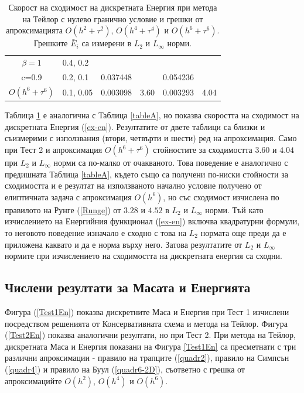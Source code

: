 \documentclass{article}
\newcommand{\rf}[1]{(\ref{#1})}
\begin{document}
\begin{table}[ht]
\begin{tabular}{||c|l|ll|ll||}
\hline
  $\beta=1$     	 	&0.4, 0.2   		&            	&         	&                  	&      \\
      c=0.9                 	&0.2, 0.1   		&0.037448	&         	& 0.054236      	&       \\
   $O(h^6+ \tau^6)$ &0.1, 0.05  		& 0.003098 	& 3.60 	& 0.003293  		& 4.04        \\
\hline
\hline 
		\end{tabular}
		\caption{Скорост на сходимост на дискретната Енергия при метода на Тейлор с нулево гранично условие и грешки от апроксимацията $O(h^{2} + \tau^2 )$, $O(h^{4} + \tau^4 )$ и $O(h^{6} + \tau^6 )$. Грешките $\bar E_i$ са измерени в $L_2$ и $L_\infty$ норми.}
\label{tableB}
\end{table}
Таблица \ref{tableB} е аналогична с Таблица \ref{tableA}, но показва скоростта на сходимост на дискретната Енергия \rf{ex-en}. Резултатите от двете таблици са близки и съизмерими с използвания (втори, четвърти и шести) ред на апроксимация. Само при  Тест 2 и апроксимация $O(h^6 + \tau^6)$ стойностите за сходимостта $3.6$0 и $4.04$ при $L_2$ и $L_{\infty}$ норми са по-малко от очакваното. Това поведение е аналогично с предишната Таблица \ref{tableA}, където също са получени по-ниски стойности за сходимостта и е резултат на използваното начално условие получено от елиптичната задача с апроксимация $O(h^6)$, но със сходимост изчислена по правилото на Рунге \rf{Runge} от $3.28$ и $4.52$ в $L_2$ и $L_\infty$ норми. Тъй като изчислението на Енергийния функционал \rf{ex-en} включва квадратурни формули, то неговото поведение изначало е сходно с това на $L_2$ нормата още преди да е приложена каквато и да е норма върху него. Затова резултатите от $L_2$ и $L_\infty$ нормите при изчислението на сходимостта на дискретната енергия са сходни.

\subsection{Числени резултати за Масата и Енергията}
Фигура \rf{Test1En} показва дискретните Маса и Енергия при Тест 1 изчислени посредством решенията от Консервативната схема и метода на Тейлор. Фигура \rf{Test2En} показва аналогични резултати, но при Тест 2. При метода на Тейлор, дискретната Маса и Енергия показани на Фигура \ref{Test1En} са пресметнати с три различни апроксимации - правило на трапците \rf{quadr2}, правило на Симпсън \rf{quadr4} и правило на Буул \rf{quadr6-2D}, съответно с грешка от апроксимацийте $O(h^2)$, $O(h^4)$ и $O(h^6)$. 
\end{document}
